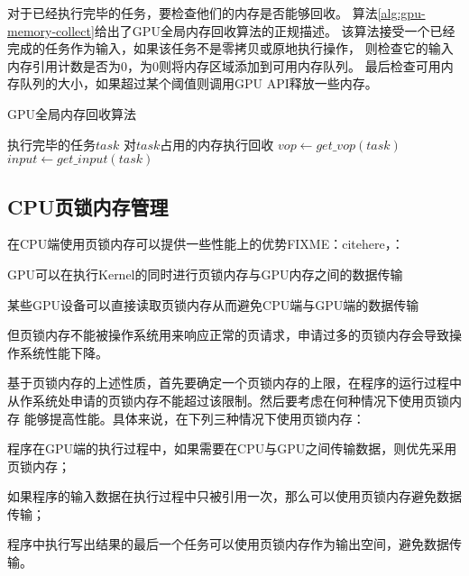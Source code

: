 对于已经执行完毕的任务，要检查他们的内存是否能够回收。
算法\ref{alg:gpu-memory-collect}给出了GPU全局内存回收算法的正规描述。
该算法接受一个已经完成的任务作为输入，如果该任务不是零拷贝或原地执行操作，
则检查它的输入内存引用计数是否为0，为0则将内存区域添加到可用内存队列。
最后检查可用内存队列的大小，如果超过某个阈值则调用GPU API释放一些内存。
\begin{algorithm}
  \caption{GPU全局内存回收算法}
  \label{alg:gpu-memory-collect}
  \begin{algorithmic}[1]
    \Require 执行完毕的任务$task$
    \Ensure 对$task$占用的内存执行回收
    \State $vop \leftarrow get\_vop(task)$
    \State $input \leftarrow get\_input(task)$
    \State {}
    \EndIf
    \EndIf
    \State {}
    \EndIf
    \EndFunction
  \end{algorithmic}
\end{algorithm}

\subsection{CPU页锁内存管理}
在CPU端使用页锁内存可以提供一些性能上的优势FIXME：citehere，：
\begin{compactitem}
  \item GPU可以在执行Kernel的同时进行页锁内存与GPU内存之间的数据传输
  \item 某些GPU设备可以直接读取页锁内存从而避免CPU端与GPU端的数据传输
\end{compactitem}
但页锁内存不能被操作系统用来响应正常的页请求，申请过多的页锁内存会导致操作系统性能下降。

基于页锁内存的上述性质，首先要确定一个页锁内存的上限，在程序的运行过程中
从作系统处申请的页锁内存不能超过该限制。然后要考虑在何种情况下使用页锁内存
能够提高性能。具体来说，在下列三种情况下使用页锁内存：
\begin{compactitem}
  \item 程序在GPU端的执行过程中，如果需要在CPU与GPU之间传输数据，则优先采用页锁内存；
  \item 如果程序的输入数据在执行过程中只被引用一次，那么可以使用页锁内存避免数据传输；
  \item 程序中执行写出结果的最后一个任务可以使用页锁内存作为输出空间，避免数据传输。
\end{compactitem}

